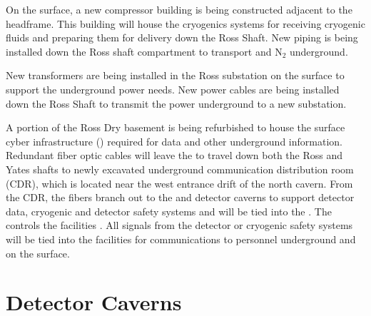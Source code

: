 On the surface, a new compressor building is being constructed
adjacent to the headframe.  This building will house the cryogenics
systems for receiving cryogenic fluids and preparing them for delivery
down the Ross Shaft.  New piping is being installed down the Ross
shaft compartment to transport  and N$_2$ underground.

New transformers are being installed in the Ross substation on the
surface to support the underground power needs.  New power cables are
being installed down the Ross Shaft to transmit the power underground
to a new substation.

A portion of the Ross Dry basement is being refurbished to house the
surface cyber infrastructure () required for data and other
underground information.  Redundant fiber optic cables will leave the
 to travel down both the Ross and Yates shafts to newly
excavated underground communication distribution room (CDR), which is
located near the west entrance drift of the north cavern.  From the
CDR, the fibers branch out to the  and detector caverns to
support detector data, cryogenic and detector safety systems and will
be tied into the .  The  controls the facilities
.  All  signals from the detector or cryogenic
safety systems will be tied into the facilities  for
communications to personnel underground and on the surface.

\section{Detector Caverns}
\label{sec:fdsp-coord-faci-caverns}


